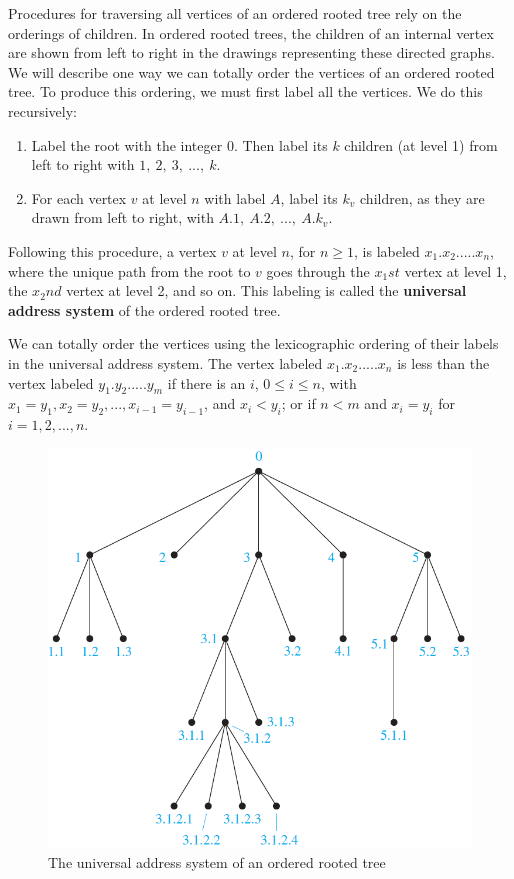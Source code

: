 \documentclass{article}
\begin{document}
Procedures for traversing all vertices of an ordered rooted tree rely on the orderings of children. In ordered rooted trees, the children of an internal vertex are shown from left to right in the drawings representing these directed graphs. We will describe one way we can totally order the vertices of an ordered rooted tree. To produce this ordering, we must first label all the vertices. We do this recursively:
\begin{enumerate}
    \item Label the root with the integer 0. Then label its $k$ children (at level 1) from left to right with $1,\ 2,\ 3,\ ...,\ k$.
    \item For each vertex $v$ at level $n$ with label $A$, label its $k_v$ children, as they are drawn from left to right, with $A.1,\ A.2,\ ...,\ A.k_v$.
\end{enumerate}
Following this procedure, a vertex $v$ at level $n$, for $n \geq 1$, is labeled $x_1.x_2. ... .x_n$, where the unique path from the root to $v$ goes through the $x_1st$ vertex at level 1, the $x_2nd$ vertex at level 2, and so on. This labeling is called the \textbf{universal address system} of the ordered rooted tree.

We can totally order the vertices using the lexicographic ordering of their labels in the universal address system. The vertex labeled $x_1.x_2. ... .x_n$ is less than the vertex labeled $y_1.y_2. ... .y_m$ if there is an $i$, $0 \leq i \leq n$, with $x_1 = y_1, x_2 = y_2, ..., x_{i-1} = y_{i-1}$, and $x_i < y_i$; or if $n < m$ and $x_i = y_i$ for $i = 1, 2, ..., n$.

\begin{figure}[h!]
    \centering
    \includegraphics[width=.6\textwidth]{img/ch11.3-figure1.png}
    \caption{The universal address system of an ordered rooted tree}
    \label{fig:ch11.3}
\end{figure}
\end{document}
